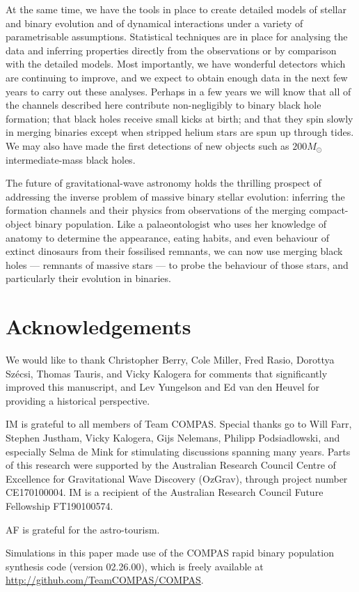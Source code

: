 \documentclass[review]{elsarticle}
\begin{document}
At the same time, we have the tools in place to create detailed models of stellar and binary evolution and of dynamical interactions under a variety of parametrisable assumptions.  Statistical techniques are in place for analysing the data and inferring properties directly from the observations or by comparison with the detailed models.  Most importantly, we have wonderful detectors which are continuing to improve, and we expect to obtain enough data in the next few years to carry out these analyses.  Perhaps in a few years we will know that all of the channels described here contribute non-negligibly to binary black hole formation; that black holes receive small kicks at birth; and that they spin slowly in merging binaries except when stripped helium stars are spun up through tides. We may also have made the first detections of new objects such as $200 M_\odot$ intermediate-mass black holes.

The future of gravitational-wave astronomy holds the thrilling prospect of addressing the inverse problem of massive binary stellar evolution: inferring the formation channels and their physics from observations of the merging compact-object binary population.  Like a palaeontologist who uses her knowledge of anatomy to determine the appearance, eating habits, and even behaviour of extinct dinosaurs from their fossilised remnants, we can now use merging black holes --- remnants of massive stars --- to probe the behaviour of those stars, and particularly their evolution in binaries.


\section*{Acknowledgements}
We would like to thank Christopher Berry, Cole Miller, Fred Rasio, Dorottya Sz\'{e}csi, Thomas Tauris, and Vicky Kalogera for comments that significantly improved this manuscript, and Lev Yungelson and Ed van den Heuvel for providing a historical perspective.  

IM is grateful to all members of Team COMPAS.  Special thanks go to Will Farr, Stephen Justham, Vicky Kalogera, Gijs Nelemans, Philipp Podsiadlowski, and especially Selma de Mink for stimulating discussions spanning many years.  Parts of this research were supported by the Australian Research Council Centre of Excellence for Gravitational Wave Discovery (OzGrav), through project number CE170100004.  IM is a recipient of the Australian Research Council Future Fellowship FT190100574.
 
AF is grateful for the astro-tourism.

Simulations in this paper made use of the COMPAS rapid binary population synthesis code (version 02.26.00), which is freely available at \url{http://github.com/TeamCOMPAS/COMPAS}.

%
%

%
%


\end{document}

